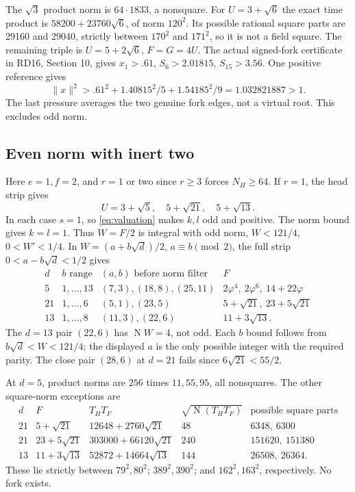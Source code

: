 \documentclass[11pt]{article}
\newcommand{\N}{\operatorname{N}}
\newcommand{\supp}[1]{\textsf{#1}}
\begin{document}
The $\sqrt3$ product norm is $64\cdot1833$, a nonsquare.
For $U=3+\sqrt6$ the exact time product is
$58200+23760\sqrt6$, of norm $120^2$.
Its possible rational square parts are 29160 and 29040,
strictly between $170^2$ and $171^2$, so it is not a field square.
The remaining triple is $U=5+2\sqrt6$, $F=G=4U$.
The actual signed-fork certificate in \supp{RD16}, Section 10,
gives $x_1>.61$, $S_6>2.01815$, $S_{15}>3.56$.
One positive reference gives
\[
 \|x\|^2>.61^2+1.40815^2/5+1.54185^2/9
 =1.032821887>1.
\]
The last pressure averages the two genuine fork edges, not a virtual
root. This excludes odd norm.

\subsection{Even norm with inert two}
Here $e=1,f=2$, and $r=1$ or two since $r\ge3$ forces
$N_H\ge64$. If $r=1$, the head strip gives
\[
 U=3+\sqrt5,\quad5+\sqrt{21},\quad5+\sqrt{13}.
\]
In each case $s=1$, so \eqref{eq:valuation} makes $k,l$
odd and positive. The norm bound gives $k=l=1$.
Thus $W=F/2$ is integral with odd norm,
$W<121/4$, $0<W'<1/4$.
In $W=(a+b\sqrt d)/2$, $a\equiv b\pmod2$, the full
strip $0<a-b\sqrt d<1/2$ gives
\[
\begin{array}{r|c|l|l}
d&b\text{ range}&(a,b)\text{ before norm filter}&F\\\hline
5&1,\ldots,13&(7,3),(18,8),(25,11)&
 2\varphi^4,\ 2\varphi^6,\ 14+22\varphi\\
21&1,\ldots,6&(5,1),(23,5)&5+\sqrt{21},\ 23+5\sqrt{21}\\
13&1,\ldots,8&(11,3),(22,6)&11+3\sqrt{13}.
\end{array}
\]
The $d=13$ pair $(22,6)$ has $\N W=4$, not odd.
Each $b$ bound follows from $b\sqrt d<W<121/4$;
the displayed $a$ is the only possible integer with the required
parity. The close pair $(28,6)$ at $d=21$ fails since
$6\sqrt{21}<55/2$.

At $d=5$, product norms are $256$ times $11,55,95$,
all nonsquares. The other square-norm exceptions are
\[
\begin{array}{r|l|l|r|l}
d&F&T_HT_F&\sqrt{\N(T_HT_F)}&\text{possible square parts}\\\hline
21&5+\sqrt{21}&12648+2760\sqrt{21}&48&6348,\ 6300\\
21&23+5\sqrt{21}&303000+66120\sqrt{21}&240&151620,\ 151380\\
13&11+3\sqrt{13}&52872+14664\sqrt{13}&144&26508,\ 26364.
\end{array}
\]
These lie strictly between $79^2,80^2$;
$389^2,390^2$; and $162^2,163^2$, respectively.
No fork exists.
\end{document}
